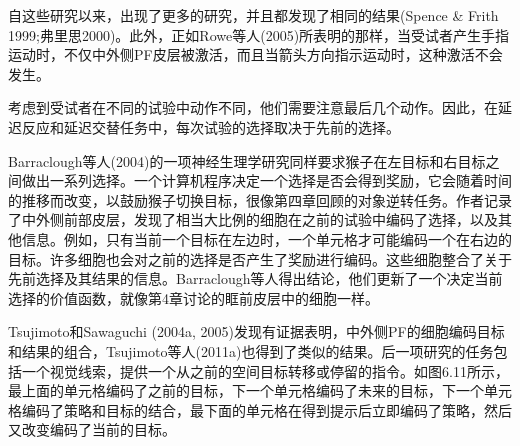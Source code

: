 自这些研究以来，出现了更多的研究，并且都发现了相同的结果(Spence \& Frith 1999;弗里思2000)。此外，正如Rowe等人(2005)所表明的那样，当受试者产生手指运动时，不仅中外侧PF皮层被激活，而且当箭头方向指示运动时，这种激活不会发生。

考虑到受试者在不同的试验中动作不同，他们需要注意最后几个动作。因此，在延迟反应和延迟交替任务中，每次试验的选择取决于先前的选择。

Barraclough等人(2004)的一项神经生理学研究同样要求猴子在左目标和右目标之间做出一系列选择。一个计算机程序决定一个选择是否会得到奖励，它会随着时间的推移而改变，以鼓励猴子切换目标，很像第四章回顾的对象逆转任务。作者记录了中外侧前部皮层，发现了相当大比例的细胞在之前的试验中编码了选择，以及其他信息。例如，只有当前一个目标在左边时，一个单元格才可能编码一个在右边的目标。许多细胞也会对之前的选择是否产生了奖励进行编码。这些细胞整合了关于先前选择及其结果的信息。Barraclough等人得出结论，他们更新了一个决定当前选择的价值函数，就像第4章讨论的眶前皮层中的细胞一样。

Tsujimoto和Sawaguchi (2004a, 2005)发现有证据表明，中外侧PF的细胞编码目标和结果的组合，Tsujimoto等人(2011a)也得到了类似的结果。后一项研究的任务包括一个视觉线索，提供一个从之前的空间目标转移或停留的指令。如图6.11所示，最上面的单元格编码了之前的目标，下一个单元格编码了未来的目标，下一个单元格编码了策略和目标的结合，最下面的单元格在得到提示后立即编码了策略，然后又改变编码了当前的目标。


